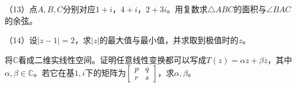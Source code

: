 \begin{exercise}
（13）点\(A , B , C\)分别对应\(1 + i\)，\(4 + i\)，\(2 + 3 i\)。用复数求\(\triangle A B C\)的面积与\(\angle B A C\)的余弦。

（14）设\(\left| z - 1 \right| = 2\)，求\(\left| z \right|\)的最大值与最小值，并求取到极值时的\(z\)。

将\(\mathbb{C}\)看成二维实线性空间。证明任意线性变换都可以写成\(T \left( z \right) = \alpha z + \beta \overline{z}\)，其中\(\alpha , \beta \in \mathbb{C}\)。若它在基\(1 , i\)下的矩阵为\(\left[ \begin{smallmatrix}p & q \\ r & s\end{smallmatrix} \right]\)，求\(\alpha , \beta\)。
\end{exercise}

